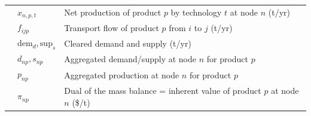 \begin{table}[htbp]
\begin{tabular}{lll}
 & $x_{n,p,t}$ & Net production of product $p$ by technology $t$ at node $n$ (t/yr) \\
 & $f_{ijp}$ & Transport flow of product $p$ from $i$ to $j$ (t/yr) \\
 & $\mathrm{dem}_{d}, \mathrm{sup}_{s}$ & Cleared demand and supply (t/yr) \\
 & $d_{np}, s_{np}$ & Aggregated demand/supply at node $n$ for product $p$ \\
 & $p_{np}$ & Aggregated production at node $n$ for product $p$ \\
 & $\pi_{np}$ & Dual of the mass balance = inherent value of product $p$ at node $n$ (\$/t) \\
\bottomrule
\end{tabular}
\end{table}

\begin{table}[htbp]
\centering
\small
\caption{Carbon ledger per tonne dry feedstock (kg CO$_2$e or kg C as
labeled): $C^{in}$ carbon content, $S$ durable storage (sequestration plus
N$_2$O, positive), $E^{+}$ process emissions, $B$ avoided-decay baseline,
$N=E^{+}-S$ direct net flux, $R^{A}_{500}$ the Paradigm-A credit rate of the
500$^\circ$C route (tCC/t dry). Generated by \texttt{carbon\_accounting.py}.}
\label{tab:s6}

\end{table}

\begin{table}[htbp]
\centering
\footnotesize
\setlength{\tabcolsep}{3pt}
\caption{Policy accounting on a common boundary (M\$/yr, near-term), all six
experiments. Credit revenue, tax, and allowance settlement are fiscal
transfers, reported separately from the producer surplus; net flux is the
physical $N=E^{+}-|S|$. Dashes mark unused instruments. Credit revenue and tax
are not welfare: read surplus as a producer-side surplus.
Generated by \texttt{carbon\_accounting.py}.}
\label{tab:s7}

\end{table}

